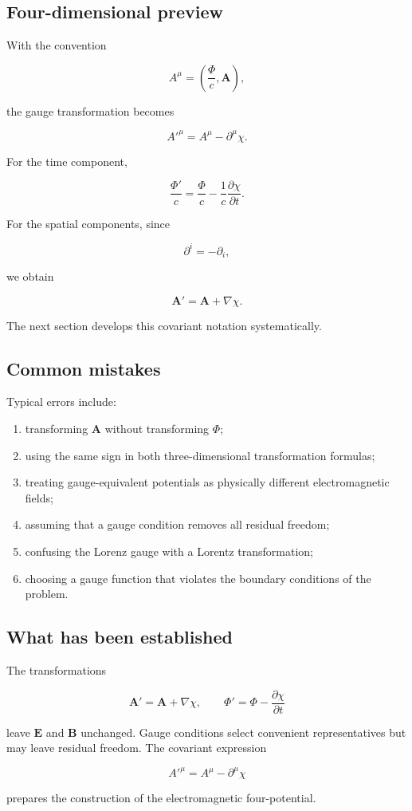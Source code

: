 \subsection{Four-dimensional preview}

With the convention

\[
A^{\mu}
=
\left(
\frac{\Phi}{c},
\mathbf{A}
\right),
\]

the gauge transformation becomes

\[
\boxed{
A'^{\mu}
=
A^{\mu}
-
\partial^{\mu}\chi
}.
\]

For the time component,

\[
\frac{\Phi'}{c}
=
\frac{\Phi}{c}
-
\frac{1}{c}
\frac{\partial\chi}{\partial t}.
\]

For the spatial components, since

\[
\partial^{i}=-\partial_i,
\]

we obtain

\[
\mathbf{A}'
=
\mathbf{A}+
\nabla\chi.
\]

The next section develops this covariant notation systematically.

\subsection{Common mistakes}

Typical errors include:

\begin{enumerate}
    \item transforming \(\mathbf{A}\) without transforming \(\Phi\);
    \item using the same sign in both three-dimensional transformation formulas;
    \item treating gauge-equivalent potentials as physically different electromagnetic fields;
    \item assuming that a gauge condition removes all residual freedom;
    \item confusing the Lorenz gauge with a Lorentz transformation;
    \item choosing a gauge function that violates the boundary conditions of the problem.
\end{enumerate}

\subsection{What has been established}

The transformations

\[
\mathbf{A}'
=
\mathbf{A}+
\nabla\chi,
\qquad
\Phi'
=
\Phi-
\frac{\partial\chi}{\partial t}
\]

leave \(\mathbf{E}\) and \(\mathbf{B}\) unchanged. Gauge conditions select convenient representatives but may leave residual freedom. The covariant expression

\[
A'^{\mu}
=
A^{\mu}-\partial^{\mu}\chi
\]

prepares the construction of the electromagnetic four-potential.
